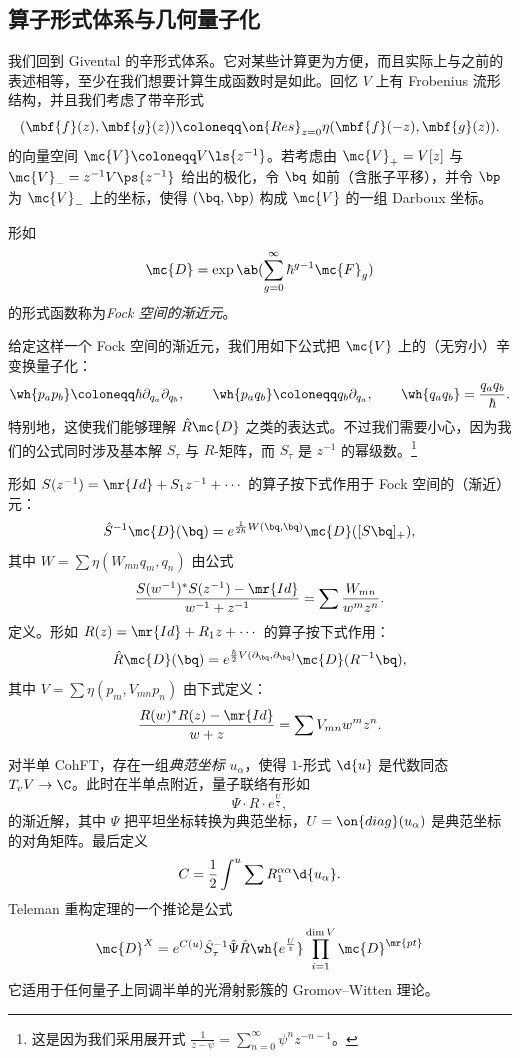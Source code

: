 \subsection{算子形式体系与几何量子化}%
\label{sub:Operator formalism and geometric quantization}

我们回到 Givental 的辛形式体系。它对某些计算更为方便，而且实际上与之前的表述相等，至少在我们想要计算生成函数时是如此。回忆 $V$ 上有 Frobenius 流形结构，并且我们考虑了带辛形式
\[ (\mbf{f}(z), \mbf{g}(z)) \coloneqq \on{Res}_{z=0} \eta(\mbf{f}(-z), \mbf{g}(z)). \]
的向量空间 $\mc{V}\coloneqq V\ls{z^{-1}}$。若考虑由 $\mc{V}_+ = V[z]$ 与 $\mc{V}_- = z^{-1}V\ps{z^{-1}}$ 给出的极化，令 $\bq$ 如前（含胀子平移），并令 $\bp$ 为 $\mc{V}_-$ 上的坐标，使得 $(\bq, \bp)$ 构成 $\mc{V}$ 的一组 Darboux 坐标。

\begin{defn}
    形如
    \[ \mc{D} = \exp\ab(\sum_{g=0}^{\infty} \hbar^{g-1} \mc{F}_g) \]
    的形式函数称为\textit{Fock 空间的渐近元}。
\end{defn}

给定这样一个 Fock 空间的渐近元，我们用如下公式把 $\mc{V}$ 上的（无穷小）辛变换量子化：
\[ \wh{p_a p_b} \coloneqq \hbar \partial_{q_a} \partial_{q_b}, \qquad \wh{p_a q_b} \coloneqq q_b \partial_{q_a}, \qquad \wh{q_a q_b} = \frac{q_a q_b}{\hbar}. \]
特别地，这使我们能够理解 $\hat{R} \mc{D}$ 之类的表达式。不过我们需要小心，因为我们的公式同时涉及基本解 $S_{\tau}$ 与 $R$-矩阵，而 $S_{\tau}$ 是 $z^{-1}$ 的幂级数。\footnote{这是因为我们采用展开式 $\frac{1}{z-\psi} = \sum_{n=0}^{\infty} \psi^n z^{-n-1}$。}

\begin{thm}
    形如 $S(z^{-1}) = \mr{Id} + S_1 z^{-1} + \cdots$ 的算子按下式作用于 Fock 空间的（渐近）元：
    \[ \hat{S}^{-1} \mc{D}(\bq) = e^{\frac{1}{2\hbar}W(\bq,\bq)} \mc{D}([S \bq]_+), \]
    其中 $W = \sum \eta(W_{mn}q_m, q_n)$ 由公式
    \[ \frac{S(w^{-1})^* S(z^{-1}) - \mr{Id}}{w^{-1}+z^{-1}} = \sum \frac{W_{mn}}{w^m z^n}. \]
    定义。形如 $R(z) = \mr{Id} + R_1 z + \cdots$ 的算子按下式作用：
    \[ \hat{R}\mc{D}(\bq) = e^{\frac{\hbar}{2} V(\partial_{\bq}, \partial_{\bq})} \mc{D}(R^{-1} \bq), \]
    其中 $V = \sum \eta(p_m, V_{mn} p_n)$ 由下式定义：
    \[ \frac{R(w)^* R(z) - \mr{Id}}{w+z} = \sum V_{mn} w^m z^n. \]
\end{thm}

对半单 CohFT，存在一组\textit{典范坐标} $u_{\alpha}$，使得 $1$-形式 $\d{u}$ 是代数同态 $T_v V \to \C$。此时在半单点附近，量子联络有形如
\[ \Psi \cdot  R \cdot e^{\frac{U}{z}}, \]
的渐近解，其中 $\Psi$ 把平坦坐标转换为典范坐标，$U = \on{diag}(u_{\alpha})$ 是典范坐标的对角矩阵。最后定义
\[ C = \frac{1}{2} \int^u \sum R_1^{\alpha\alpha} \d{u_{\alpha}}. \]
Teleman 重构定理的一个推论是公式
\[ \mc{D}^X = e^{C(u)} \hat{S}^{-1}_{\tau} \hat{\Psi} \hat{R} \wh{e^{\frac{U}{z}}} \prod_{i=1}^{\dim V} \mc{D}^{\mr{pt}} \]
它适用于任何量子上同调半单的光滑射影簇的 Gromov--Witten 理论。

